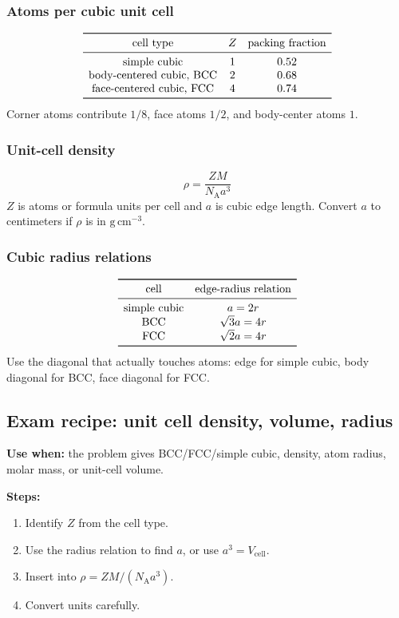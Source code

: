 \subsubsection{Atoms per cubic unit cell}
\[
\begin{array}{c c c}
\toprule
\text{cell type} & Z & \text{packing fraction}\\
\midrule
\text{simple cubic} & 1 & 0.52\\
\text{body-centered cubic, BCC} & 2 & 0.68\\
\text{face-centered cubic, FCC} & 4 & 0.74\\
\bottomrule
\end{array}
\]
Corner atoms contribute \(1/8\), face atoms \(1/2\), and body-center atoms \(1\).

\subsubsection{Unit-cell density}
\[
\rho=\frac{ZM}{N_{\mathrm A}a^3}
\]
\(Z\) is atoms or formula units per cell and \(a\) is cubic edge length. Convert \(a\) to centimeters if \(\rho\) is in \(\mathrm{g\,cm^{-3}}\).

\subsubsection{Cubic radius relations}
\[
\begin{array}{c c}
\toprule
\text{cell} & \text{edge-radius relation}\\
\midrule
\text{simple cubic} & a=2r\\
\text{BCC} & \sqrt{3}a=4r\\
\text{FCC} & \sqrt{2}a=4r\\
\bottomrule
\end{array}
\]
Use the diagonal that actually touches atoms: edge for simple cubic, body diagonal for BCC, face diagonal for FCC.

\subsection{Exam recipe: unit cell density, volume, radius}
\textbf{Use when:} the problem gives BCC/FCC/simple cubic, density, atom radius, molar mass, or unit-cell volume.

\textbf{Steps:}
\begin{enumerate}
    \item Identify \(Z\) from the cell type.
    \item Use the radius relation to find \(a\), or use \(a^3=V_{\mathrm{cell}}\).
    \item Insert into \(\rho=ZM/(N_{\mathrm A}a^3)\).
    \item Convert units carefully.
\end{enumerate}

